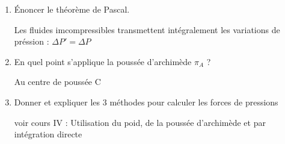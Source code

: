 \begin{enumerate}[label=\arabic{enumi} - , left=0pt, itemsep=1em]
\begin{solution}
          \end{solution}

         \item Énoncer le théorème de Pascal. \par
         \begin{solution}
            Les fluides imcompressibles transmettent intégralement les variations de préssion : $\Delta P' = \Delta P $
            
          \end{solution}

         \item En quel point s'applique la poussée d'archimède $\pi_A$ ? \par
         \begin{solution}
            Au centre de poussée C
          \end{solution}


         \item Donner et expliquer les 3 méthodes pour calculer les forces de pressions \par
         \begin{solution}
            voir cours IV : Utilisation du poid, de la poussée d'archimède et par intégration directe
          \end{solution}
\end{enumerate}
